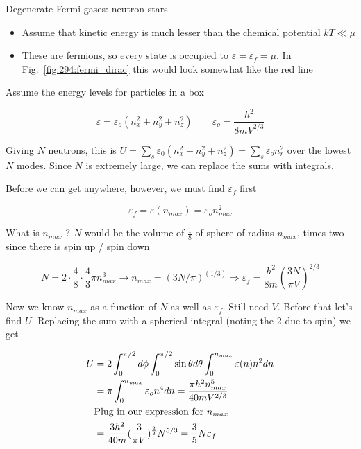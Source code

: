 \documentclass[10pt]{article}
\begin{document}
\begin{example}
	Degenerate Fermi gases: neutron stars

	\begin{itemize}
		\item Assume that kinetic energy is much lesser than the chemical potential $ kT \ll \mu $ 
		\item These are fermions, so every state is occupied to $ \varepsilon = \varepsilon_f = \mu $. In Fig.~\ref{fig:294:fermi_dirac} this would look somewhat like the red line
	\end{itemize}

	Assume the energy levels for particles in a box 

	\begin{equation}
		\varepsilon = \varepsilon_o (n_x^2 + n_y^2 + n_z^2) \qquad \varepsilon_o = \frac{h^2}{8mV^{2 /3}}
	\end{equation}

	Giving $ N $ neutrons, this is $ U = \sum_s \varepsilon_0 (n_x^2 + n_y^2 + n_z^2) = \sum_s \varepsilon_o n_r^2  $ over the lowest $ N $ modes. 
	Since $ N $  is extremely large, we can replace the sums with integrals.

	Before we can get anywhere, however, we must find $ \varepsilon_f $ first

	\begin{equation}
		\varepsilon_f = \varepsilon(n_{max}) = \varepsilon_o n^2_{max}
	\end{equation}

	What is $ n_{max} $  ?
	$ N $  would be the volume of $ \frac{1}{8} $ of sphere of radius $ n_{max} $, times two since there is spin up / spin down

	\begin{equation}
		N = 2 \cdot \frac{4}{8} \cdot \frac{4}{3} \pi n^3_{max} \rightarrow n_{max} = (3N /\pi)^(1/3) \Rightarrow \varepsilon_f = \frac{h^2}{8m} \left( \frac{3N}{\pi V} \right) ^ {2 /3}
		\label{eq:294:efermi_deriv}
	\end{equation}

	Now we know $ n_{max} $ as a function of $ N $ as well as $ \varepsilon_f $. Still need $ V $.
	Before that let's find $ U $. Replacing the sum with a spherical integral (noting the 2 due to spin) we get

	\begin{equation}
		\begin{split}
			U &= 2 \int_{0}^{\pi /2} d\phi \int_{0}^{\pi /2}  \sin \theta d\theta \int_{0}^{n_{max}} \varepsilon(n) n^2 dn  \\
			 &= \pi \int_{0}^{n_{max}} \varepsilon_o n^4 dn = \frac{\pi h^2 n^5_{max}}{40mV^{2 /3}}   \\
			 & \text{Plug in our expression for $ n_{max} $ } \\
			 &= \frac{3h^2}{40m} (\frac{3}{\pi V})^{\frac{2}{3}} N^{5 /3} = \frac{3}{5} N \varepsilon_f \\
		\end{split}
	\end{equation}



\end{example}
\end{document}
